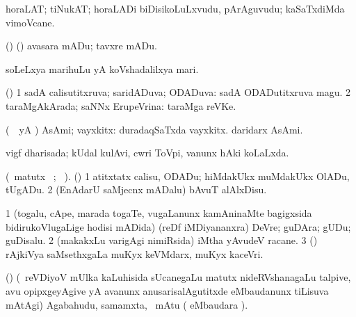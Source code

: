 {{{{{{ \bentry
{}
\gl{\nA}
\bmng
horaLAT; tiNukAT; horaLADi biDisikoLuLxvudu, pArAguvudu; kaSaTxdiMda vimoVcane. 
\emng

\noindent 
\gl{\pagu}
\bmng
{} (\ame) (\ashi) avasara mADu; tavxre mADu. 
\emng
\eentry

\bentry 
{}
  \gl{\nA}\bmng
soLeLxya marihuLu yA koVshadalilxya mari. 
\emng
\eentry

\bentry
{} 
\gl{\gu}
\bmng
(\AmA) 
\bnum
\num{1} sadA calisutitxruva; saridADuva; ODADuva:  sadA ODADutitxruva magu. 
\num{2} taraMgAkArada; saNNx ErupeVrina:  taraMga reVKe. 
\enum
\emng
\eentry

\bentry
{}
  \gl{\nA}\bmng
(\pArxparx\ \hA\ yA \pArxM) AsAmi; vayxkitx:  duradaqSaTxda vayxkitx.  daridarx AsAmi. 
\emng
\eentry

\bentry
{}
  \gl{\gu}\bmng
vigf dharisada; kUdal kulAvi, cwri ToVpi, \mo vanunx hAki koLaLxda. 
\emng
\eentry

\bentry
{}
  \gl{\kirx} (\BU\ matutx \BUkaq\ ; \vakaq\ ). \bmng
(\AmA) 
\bnum
\num{1} atitxtatx calisu, ODADu; hiMdakUkx muMdakUkx OlADu, tUgADu. 
\num{2} (EnAdarU saMjecnx mADalu) bAvuT alAlxDisu. 
\enum
\emng
\eentry

\bentry
{}
  \gl{\nA}\bmng
\bnum
\num{1} (togalu, cApe, marada togaTe, \mo vugaLanunx kamAninaMte bagigxsida bidirukoVlugaLige hodisi mADida) (reDf iMDiyananxra) DeVre; guDAra; gUDu; guDisalu. 
\num{2} (makakxLu \mo varigAgi nimiRsida) iMtha yAvudeV racane. 
\num{3} (\ame) rAjkiVya saMsethxgaLa muKyx keVMdarx, muKyx kaceVri. 
\enum
\emng
\eentry

\bentry
{}
  \gl{\BAavayx}\bmng
(\AmA) (\kanmu\ reVDiyoV mUlka kaLuhisida sUcanegaLu matutx nideRVshanagaLu talpive, avu opipxgeyAgive yA avanunx anusarisalAgutitxde eMbaudanunx tiLisuva mAtAgi) Agabahudu, samamxta, \mo\ mAtu ( eMbaudara \saMkiSx). 
\emng
\eentry

}}}}}}
